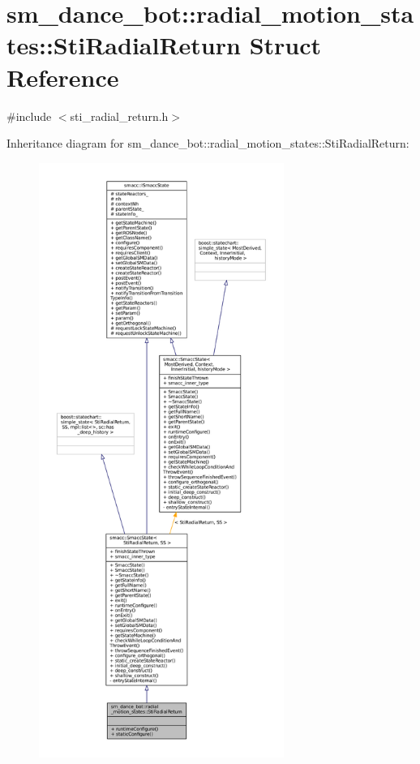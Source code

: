\hypertarget{structsm__dance__bot_1_1radial__motion__states_1_1StiRadialReturn}{}\section{sm\+\_\+dance\+\_\+bot\+:\+:radial\+\_\+motion\+\_\+states\+:\+:Sti\+Radial\+Return Struct Reference}
\label{structsm__dance__bot_1_1radial__motion__states_1_1StiRadialReturn}


{\ttfamily \#include $<$sti\+\_\+radial\+\_\+return.\+h$>$}



Inheritance diagram for sm\+\_\+dance\+\_\+bot\+:\+:radial\+\_\+motion\+\_\+states\+:\+:Sti\+Radial\+Return\+:
\nopagebreak
\begin{figure}[H]
\begin{center}
\leavevmode
\includegraphics[height=550pt]{structsm__dance__bot_1_1radial__motion__states_1_1StiRadialReturn__inherit__graph}
\end{center}
\end{figure}


